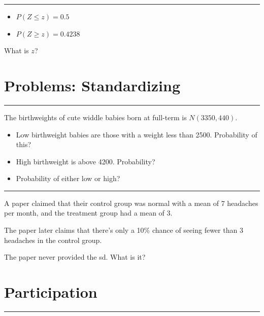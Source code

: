 \documentclass[
  letterpaper,
  DIV=11,
  numbers=noendperiod,
  oneside]{scrreprt}
\providecommand{\tightlist}{%
  \setlength{\itemsep}{0pt}\setlength{\parskip}{0pt}}\usepackage{longtable,booktabs,array}
\begin{document}
\begin{center}\rule{0.5\linewidth}{0.5pt}\end{center}

\begin{itemize}
\tightlist
\item
  \(P(Z \le z) = 0.5\)
\item
  \(P(Z \ge z) = 0.4238\)
\end{itemize}

What is \(z\)?

\hypertarget{problems-standardizing}{%
\section{Problems: Standardizing}\label{problems-standardizing}}

\begin{center}\rule{0.5\linewidth}{0.5pt}\end{center}

The birthweights of cute widdle babies born at full-term is
\(N(3350, 440)\).

\begin{itemize}
\tightlist
\item
  Low birthweight babies are those with a weight less than 2500.
  Probability of this?
\item
  High birthweight is above 4200. Probability?
\item
  Probability of either low or high?
\end{itemize}

\begin{center}\rule{0.5\linewidth}{0.5pt}\end{center}

A paper claimed that their control group was normal with a mean of 7
headaches per month, and the treatment group had a mean of 3.

The paper later claims that there's only a 10\% chance of seeing fewer
than 3 headaches in the control group.

The paper never provided the sd. What is it?

\hypertarget{participation}{%
\section{Participation}\label{participation}}

\begin{center}\rule{0.5\linewidth}{0.5pt}\end{center}
\end{document}
